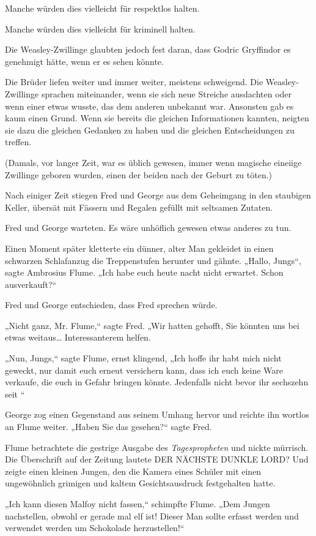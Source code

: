 {Manche würden dies vielleicht für respektlos halten.

Manche würden dies vielleicht für kriminell halten.

Die Weasley-Zwillinge glaubten jedoch fest daran, dass Godric Gryffindor es genehmigt hätte, wenn er es sehen könnte.

Die Brüder liefen weiter und immer weiter, meistens schweigend. Die Weasley-Zwillinge sprachen miteinander, wenn sie sich neue Streiche ausdachten oder wenn einer etwas wusste, das dem anderen unbekannt war. Ansonsten gab es kaum einen Grund. Wenn sie bereits die gleichen Informationen kannten, neigten sie dazu die gleichen Gedanken zu haben und die gleichen Entscheidungen zu treffen.

(Damals, vor langer Zeit, war es üblich gewesen, immer wenn magische eineiige Zwillinge geboren wurden, einen der beiden nach der Geburt zu töten.)

Nach einiger Zeit stiegen Fred und George aus dem Geheimgang in den staubigen Keller, übersät mit Fässern und Regalen gefüllt mit seltsamen Zutaten.

Fred und George warteten. Es wäre unhöflich gewesen etwas anderes zu tun.

Einen Moment später kletterte ein dünner, alter Man gekleidet in einen schwarzen Schlafanzug die Treppenstufen herunter und gähnte. „Hallo, Jungs“, sagte Ambrosius Flume. „Ich habe euch heute nacht nicht erwartet. Schon ausverkauft?“

Fred und George entschieden, dass Fred sprechen würde.

„Nicht ganz, Mr. Flume,“ sagte Fred. „Wir hatten gehofft, Sie könnten uns bei etwas weitaus… Interessanterem helfen.

„Nun, Jungs,“ sagte Flume, ernst klingend, „Ich hoffe ihr habt mich nicht geweckt, nur damit euch erneut versichern kann, dass ich euch keine Ware verkaufe, die euch in Gefahr bringen könnte. Jedenfalls nicht bevor ihr sechszehn seit \later“

George zog einen Gegenstand aus seinem Umhang hervor und reichte ihn wortlos an Flume weiter. „Haben Sie das gesehen?“ sagte Fred.

Flume betrachtete die gestrige Ausgabe des \emph{Tagespropheten} und nickte mürrisch. Die Überschrift auf der Zeitung lautete DER NÄCHSTE DUNKLE LORD? Und zeigte einen kleinen Jungen, den die Kamera eines Schüler mit einen ungewöhnlich grimigen und kaltem Gesichtsausdruck festgehalten hatte.

„Ich kann diesen Malfoy nicht fassen,“ schimpfte Flume. „Dem Jungen nachstellen, obwohl er gerade mal elf ist! Dieser Man sollte erfasst werden und verwendet werden um Schokolade herzustellen!“

}
